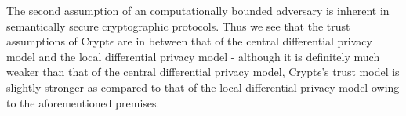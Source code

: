 The second assumption of an computationally bounded adversary is inherent in semantically secure cryptographic protocols. Thus we see that the trust assumptions of Crypt$\epsilon$ are in between that of the central differential privacy model and the local differential privacy model - although it is definitely much weaker than that of the central differential privacy model, Crypt$\epsilon$'s trust model is slightly stronger as compared to that of the local differential privacy model owing to the aforementioned premises. \\
